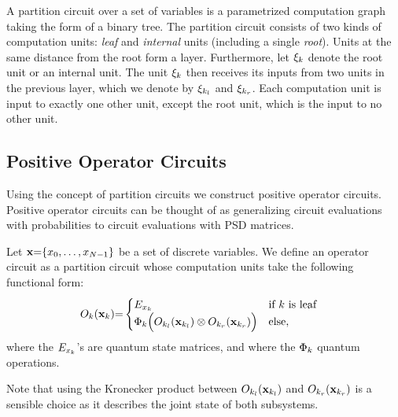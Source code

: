 \begin{definition}
	\label{def:partition_circuit}
	A partition circuit over a set of variables is a parametrized computation graph taking the form of a binary tree. The partition circuit consists of two kinds of computation units:
	\textit{leaf} and \textit{internal} units (including a single \textit{root}).
	Units at the same distance from the root form a layer.
	Furthermore, let $\xi_k$ denote the root unit or an internal unit. The unit $\xi_k$ then receives its inputs from two units in the previous layer, which we denote by $\xi_{k_l}$ and $\xi_{k_r}$. Each computation unit is input to exactly one other unit, except the root unit, which is the input to no other unit.
\end{definition}






\subsection{Positive Operator Circuits}

Using the concept of partition circuits we construct positive operator circuits. Positive operator circuits can be thought of as generalizing circuit evaluations with probabilities to circuit evaluations with PSD matrices.
\begin{definition}
	\label{def:poc}
	Let   $\mathbf{x}{=}\{x_0,\dots ,x_{N{-}1}  \}$ be a set of discrete variables.
	We define an operator circuit as a partition circuit whose computation units take the following functional form:
	\begin{align}
		 & {O}_k(\mathbf{x}_k){=}
		\begin{cases}
			E_{x_k}
			 & \text{if $k$ is leaf}
			\\
			\Phi_k \Bigl(O_{k_l}(\mathbf{x}_{k_l}) \otimes O_{k_r}(\mathbf{x}_{k_r}) \Bigr)
			 & \text{else},
		\end{cases}
		\label{eq:poc:def}
	\end{align}
	where the  $E_{x_k}$'s are quantum state matrices, and where the $\Phi_k$ quantum operations.
\end{definition}
Note that using the Kronecker product between $O_{k_l}(\mathbf{x}_{k_l})$ and  $O_{k_r}(\mathbf{x}_{k_r})$ is a sensible choice as it describes the joint state of both subsystems.





